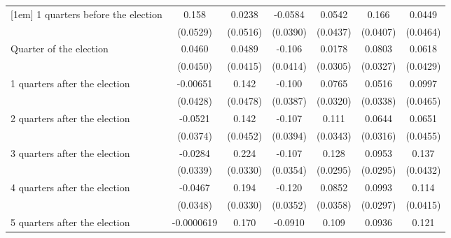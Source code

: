 \begin{table}[htbp]
\begin{tabular}{l*{6}{c}}
[1em]
 1 quarters before the election&       0.158\sym{**} &      0.0238         &     -0.0584         &      0.0542         &       0.166\sym{***}&      0.0449         \\
                    &    (0.0529)         &    (0.0516)         &    (0.0390)         &    (0.0437)         &    (0.0407)         &    (0.0464)         \\
[1em]
Quarter of the election&      0.0460         &      0.0489         &      -0.106\sym{*}  &      0.0178         &      0.0803\sym{*}  &      0.0618         \\
                    &    (0.0450)         &    (0.0415)         &    (0.0414)         &    (0.0305)         &    (0.0327)         &    (0.0429)         \\
[1em]
 1 quarters after the election&    -0.00651         &       0.142\sym{**} &      -0.100\sym{**} &      0.0765\sym{*}  &      0.0516         &      0.0997\sym{*}  \\
                    &    (0.0428)         &    (0.0478)         &    (0.0387)         &    (0.0320)         &    (0.0338)         &    (0.0465)         \\
[1em]
 2 quarters after the election&     -0.0521         &       0.142\sym{**} &      -0.107\sym{**} &       0.111\sym{**} &      0.0644\sym{*}  &      0.0651         \\
                    &    (0.0374)         &    (0.0452)         &    (0.0394)         &    (0.0343)         &    (0.0316)         &    (0.0455)         \\
[1em]
 3 quarters after the election&     -0.0284         &       0.224\sym{***}&      -0.107\sym{**} &       0.128\sym{***}&      0.0953\sym{**} &       0.137\sym{**} \\
                    &    (0.0339)         &    (0.0330)         &    (0.0354)         &    (0.0295)         &    (0.0295)         &    (0.0432)         \\
[1em]
 4 quarters after the election&     -0.0467         &       0.194\sym{***}&      -0.120\sym{***}&      0.0852\sym{*}  &      0.0993\sym{***}&       0.114\sym{**} \\
                    &    (0.0348)         &    (0.0330)         &    (0.0352)         &    (0.0358)         &    (0.0297)         &    (0.0415)         \\
[1em]
 5 quarters after the election&  -0.0000619         &       0.170\sym{***}&     -0.0910\sym{**} &       0.109\sym{***}&      0.0936\sym{**} &       0.121\sym{**} \\

\end{tabular}
\end{table}
